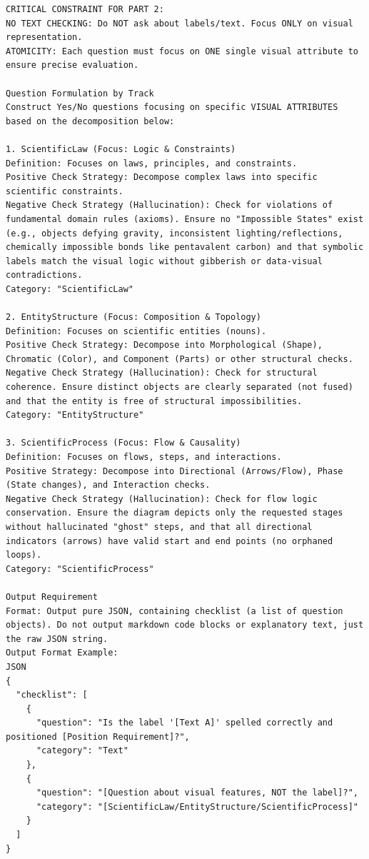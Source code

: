\documentclass[runningheads]{llncs}
\begin{document}
\begin{tcolorbox}[colback=white, colframe=blue!50!black, boxrule=1pt, arc=2mm, breakable]
\begin{lstlisting}[breaklines=true, breakindent=0pt, basicstyle=\scriptsize\ttfamily, columns=fullflexible]
CRITICAL CONSTRAINT FOR PART 2:
NO TEXT CHECKING: Do NOT ask about labels/text. Focus ONLY on visual representation.
ATOMICITY: Each question must focus on ONE single visual attribute to ensure precise evaluation.

Question Formulation by Track
Construct Yes/No questions focusing on specific VISUAL ATTRIBUTES based on the decomposition below:

1. ScientificLaw (Focus: Logic & Constraints)
Definition: Focuses on laws, principles, and constraints.
Positive Check Strategy: Decompose complex laws into specific scientific constraints.
Negative Check Strategy (Hallucination): Check for violations of fundamental domain rules (axioms). Ensure no "Impossible States" exist (e.g., objects defying gravity, inconsistent lighting/reflections, chemically impossible bonds like pentavalent carbon) and that symbolic labels match the visual logic without gibberish or data-visual contradictions.
Category: "ScientificLaw"

2. EntityStructure (Focus: Composition & Topology)
Definition: Focuses on scientific entities (nouns).
Positive Check Strategy: Decompose into Morphological (Shape), Chromatic (Color), and Component (Parts) or other structural checks.
Negative Check Strategy (Hallucination): Check for structural coherence. Ensure distinct objects are clearly separated (not fused) and that the entity is free of structural impossibilities.
Category: "EntityStructure"

3. ScientificProcess (Focus: Flow & Causality)
Definition: Focuses on flows, steps, and interactions.
Positive Strategy: Decompose into Directional (Arrows/Flow), Phase (State changes), and Interaction checks.
Negative Check Strategy (Hallucination): Check for flow logic conservation. Ensure the diagram depicts only the requested stages without hallucinated "ghost" steps, and that all directional indicators (arrows) have valid start and end points (no orphaned loops).
Category: "ScientificProcess"

Output Requirement
Format: Output pure JSON, containing checklist (a list of question objects). Do not output markdown code blocks or explanatory text, just the raw JSON string.
Output Format Example:
JSON
{
  "checklist": [
    {
      "question": "Is the label '[Text A]' spelled correctly and positioned [Position Requirement]?",
      "category": "Text"
    },
    {
      "question": "[Question about visual features, NOT the label]?",
      "category": "[ScientificLaw/EntityStructure/ScientificProcess]"
    }
  ]
}
\end{lstlisting}
\end{tcolorbox}
\end{document}
